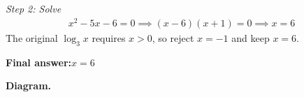 \documentclass[11pt]{article}
\begin{document}
\textit{Step 2: Solve}
\[\begin{gathered}
x^2 - 5x - 6 = 0 \implies (x-6)(x+1) = 0 \implies x = 6
\end{gathered}\]
The original \( \log_3 x \) requires \( x > 0 \), so reject \( x = -1 \) and keep \( x = 6 \).

\begin{answerbox}
\textbf{Final answer:}\quad \(\displaystyle x = 6\)
\end{answerbox}
\textbf{Diagram.}

\begin{center}
\end{center}
\end{document}
